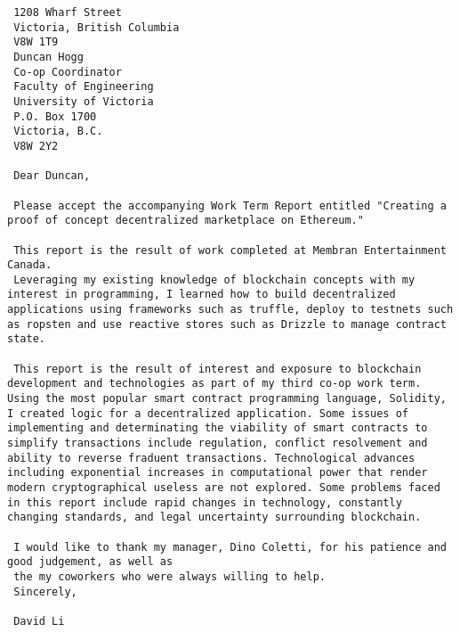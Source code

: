  \linespread{1}
 \begin{verbatim}
 1208 Wharf Street
 Victoria, British Columbia
 V8W 1T9
 Duncan Hogg
 Co-op Coordinator
 Faculty of Engineering
 University of Victoria
 P.O. Box 1700
 Victoria, B.C.
 V8W 2Y2
 
 Dear Duncan, 
 
 Please accept the accompanying Work Term Report entitled "Creating a proof of concept decentralized marketplace on Ethereum."
 
 This report is the result of work completed at Membran Entertainment Canada.
 Leveraging my existing knowledge of blockchain concepts with my interest in programming, I learned how to build decentralized applications using frameworks such as truffle, deploy to testnets such as ropsten and use reactive stores such as Drizzle to manage contract state.
  
 This report is the result of interest and exposure to blockchain development and technologies as part of my third co-op work term. Using the most popular smart contract programming language, Solidity, I created logic for a decentralized application. Some issues of implementing and determinating the viability of smart contracts to simplify transactions include regulation, conflict resolvement and ability to reverse fraduent transactions. Technological advances including exponential increases in computational power that render modern cryptographical useless are not explored. Some problems faced in this report include rapid changes in technology, constantly changing standards, and legal uncertainty surrounding blockchain.
  
 I would like to thank my manager, Dino Coletti, for his patience and good judgement, as well as
 the my coworkers who were always willing to help.
 Sincerely,

 David Li
 \end{verbatim}